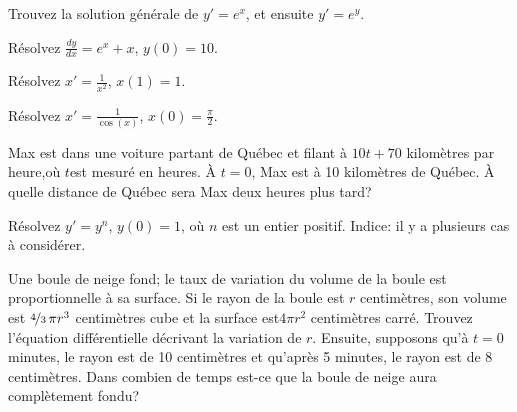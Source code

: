 \begin{exercise}
	Trouvez la solution générale de $y' = e^x$,  et ensuite $y' = e^y$.
\end{exercise}


\setcounter{exercise}{100}

\begin{exercise}
	Résolvez $\frac{dy}{dx} = e^x + x$, $y(0) = 10$.
\end{exercise}

\begin{exercise}
	Résolvez $x' = \frac{1}{x^2}$, $x(1)=1$.
\end{exercise}

\begin{exercise}
	Résolvez $x' = \frac{1}{\cos(x)}$, $x(0)=\frac{\pi}{2}$.
\end{exercise}

\begin{exercise}
	Max est dans une voiture partant de Québec et filant à $10t+70$ kilomètres par heure,où $t$est mesuré en heures.
	À $t=0$, Max est à 10 kilomètres de Québec.  À quelle distance de Québec sera Max deux heures plus tard?
\end{exercise}

\begin{exercise}
	Résolvez $y' = y^n$, $y(0) = 1$, où $n$ est un entier positif.
	Indice: il y a plusieurs cas à considérer.
\end{exercise}

\begin{exercise}
	Une boule de neige fond; le taux de variation du volume de la boule est proportionnelle à sa surface.
	Si le rayon de la boule est $r$ centimètres, son volume est $\nicefrac{4}{3}\,\pi r^3$ centimètres cube
	et la surface est$4 \pi r^2$ centimètres carré.
	Trouvez l'équation différentielle décrivant la variation de $r$.
	Ensuite, supposons qu'à $t=0$ minutes, le rayon est de 10 centimètres et qu'après 5 minutes, le rayon est de 8 centimètres.
	Dans combien de temps est-ce que la boule de neige aura complètement fondu?
\end{exercise}

